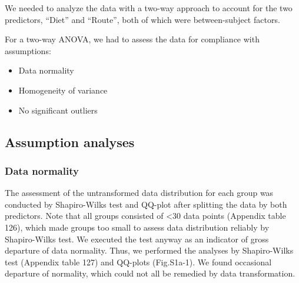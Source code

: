\documentclass[
  12pt,
  letterpaper,
]{article}
\providecommand{\tightlist}{%
  \setlength{\itemsep}{0pt}\setlength{\parskip}{0pt}}
\begin{document}
We needed to analyze the data with a two-way approach to account for the two predictors, ``Diet'' and ``Route'', both of which were between-subject factors.

For a two-way ANOVA, we had to assess the data for compliance with assumptions:

\begin{itemize}
\tightlist
\item
  Data normality
\item
  Homogeneity of variance
\item
  No significant outliers
\end{itemize}

\subsection{Assumption analyses}\label{assumption-analyses-3}

\subsubsection{Data normality}\label{data-normality-3}

The assessment of the untransformed data distribution for each group was conducted by Shapiro-Wilks test and QQ-plot after splitting the data by both predictors. Note that all groups consisted of \textless30 data points (Appendix table 126), which made groups too small to assess data distribution reliably by Shapiro-Wilks test. We executed the test anyway as an indicator of gross departure of data normality. Thus, we performed the analyses by Shapiro-Wilks test (Appendix table 127) and QQ-plots (Fig.S1a-1). We found occasional departure of normality, which could not all be remedied by data transformation.
\end{document}
